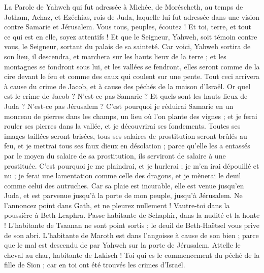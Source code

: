 \begin{multicols}{2}
\VerseOne{}La Parole de Yahweh qui fut adressée à Michée, de Moréscheth, au temps de Jotham, Achaz, et Ezéchias, rois de Juda, laquelle lui fut adressée dans une vision contre Samarie et Jérusalem.
Vous tous, peuples, écoutez ! Et toi, terre, et tout ce qui est en elle, soyez attentifs ! Et que le Seigneur, Yahweh, soit témoin contre vous, le Seigneur, sortant du palais de sa sainteté.
Car voici, Yahweh sortira de son lieu, il descendra, et marchera sur les hauts lieux de la terre ;
et les montagnes se fondront sous lui, et les vallées se fendront, elles seront comme de la cire devant le feu et comme des eaux qui coulent sur une pente.
Tout ceci arrivera à cause du crime de Jacob, et à cause des péchés de la maison d'Israël. Or quel est le crime de Jacob ? N'est-ce pas Samarie ? Et quels sont les hauts lieux de Juda ? N'est-ce pas Jérusalem ?
C'est pourquoi je réduirai Samarie en un monceau de pierres dans les champs, un lieu où l'on plante des vignes ; et je ferai rouler ses pierres dans la vallée, et je découvrirai ses fondements.
Toutes ses images taillées seront brisées, tous ses salaires de prostitution seront brûlés au feu, et je mettrai tous ses faux dieux en désolation ; parce qu'elle les a entassés par le moyen du salaire de sa prostitution, ils serviront de salaire à une prostituée.
C'est pourquoi je me plaindrai, et je hurlerai ; je m'en irai dépouillé et nu ; je ferai une lamentation comme celle des dragons, et je mènerai le deuil comme celui des autruches.
Car sa plaie est incurable, elle est venue jusqu'en Juda, et est parvenue jusqu'à la porte de mon peuple, jusqu'à Jérusalem.
Ne l'annoncez point dans Gath, et ne pleurez nullement ! Vautre-toi dans la poussière à Beth-Leaphra.
Passe habitante de Schaphir, dans la nudité et la honte ! L'habitante de Tsaanan ne sont point sortis ; le deuil de Beth-Haëtsel vous prive de son abri.
L'habitante de Maroth est dans l'angoisse à cause de son bien ; parce que le mal est descendu de par Yahweh sur la porte de Jérusalem.
Attelle le cheval au char, habitante de Lakisch ! Toi qui es le commencement du péché de la fille de Sion ; car en toi ont été trouvés les crimes d'Israël.

\end{multicols}

